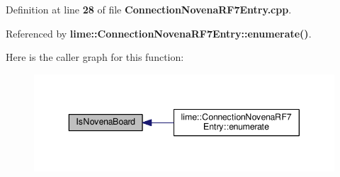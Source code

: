 Definition at line {\bf 28} of file {\bf Connection\+Novena\+R\+F7\+Entry.\+cpp}.



Referenced by {\bf lime\+::\+Connection\+Novena\+R\+F7\+Entry\+::enumerate()}.



Here is the caller graph for this function\+:
\nopagebreak
\begin{figure}[H]
\begin{center}
\leavevmode
\includegraphics[width=343pt]{d0/dee/ConnectionNovenaRF7Entry_8cpp_ae8f92fb0d283f91064eb8bb0fa1ce720_icgraph}
\end{center}
\end{figure}



